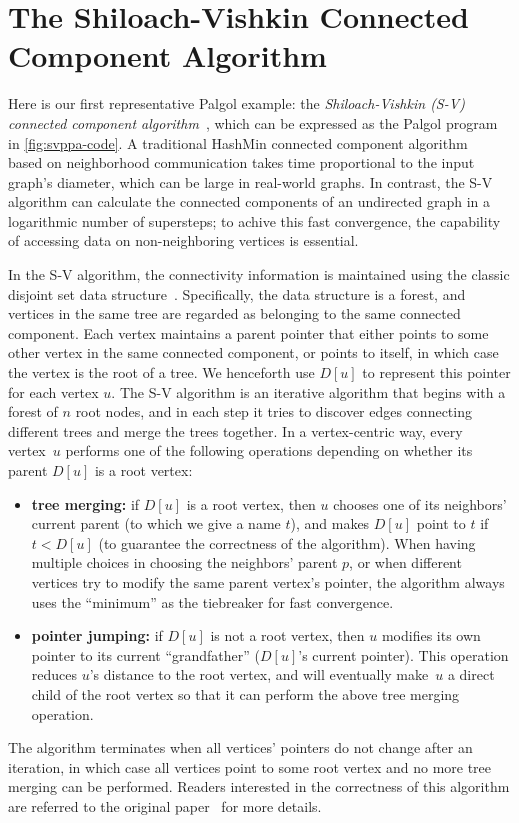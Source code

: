 \documentclass{sokendai_thesis} %
\begin{document}
\section{The Shiloach-Vishkin Connected Component Algorithm}
\label{sec:sv-algorithm}

Here is our first representative Palgol example: the \emph{Shiloach-Vishkin (S-V) connected component algorithm}~\cite{connectivity}, which can be expressed as the Palgol program in \autoref{fig:svppa-code}.
A traditional HashMin connected component algorithm~\cite{connectivity} based on neighborhood communication takes time proportional to the input graph's diameter, which can be large in real-world graphs.
In contrast, the S-V algorithm can calculate the connected components of an undirected graph in a logarithmic number of supersteps; to achive this fast convergence, the capability of accessing data on non-neighboring vertices is essential.

In the S-V algorithm, the connectivity information is maintained using the classic disjoint set data structure~\cite{disjointset}.
Specifically, the data structure is a forest, and vertices in the same tree are regarded as belonging to the same connected component.
Each vertex maintains a parent pointer that either points to some other vertex in the same connected component, or points to itself, in which case the vertex is the root of a tree.
We henceforth use $D[u]$ to represent this pointer for each vertex $u$.
The S-V algorithm is an iterative algorithm that begins with a forest of $n$ root nodes, and in each step it tries to discover edges connecting different trees and merge the trees together.
In a vertex-centric way, every vertex~$u$ performs one of the following operations depending on whether its parent $D[u]$ is a root vertex:
\begin{itemize}
 \item \textbf{tree merging:}
  if $D[u]$ is a root vertex, then $u$ chooses one of its neighbors' current parent (to which we give a name $t$), and makes $D[u]$ point to $t$ if $t<D[u]$ (to guarantee the correctness of the algorithm).
  When having multiple choices in choosing the neighbors' parent $p$, or when different vertices try to modify the same parent vertex's pointer, the algorithm always uses the ``minimum'' as the tiebreaker for fast convergence.
 \item \textbf{pointer jumping:}
  if $D[u]$ is not a root vertex, then $u$ modifies its own pointer to its current ``grandfather'' ($D[u]$'s current pointer).
  This operation reduces $u$'s distance to the root vertex, and will eventually make~$u$ a direct child of the root vertex so that it can perform the above tree merging operation.
\end{itemize}
The algorithm terminates when all vertices' pointers do not change after an iteration, in which case all vertices point to some root vertex and no more tree merging can be performed.
Readers interested in the correctness of this algorithm are referred to the original paper~\cite{connectivity} for more details.
\end{document}
